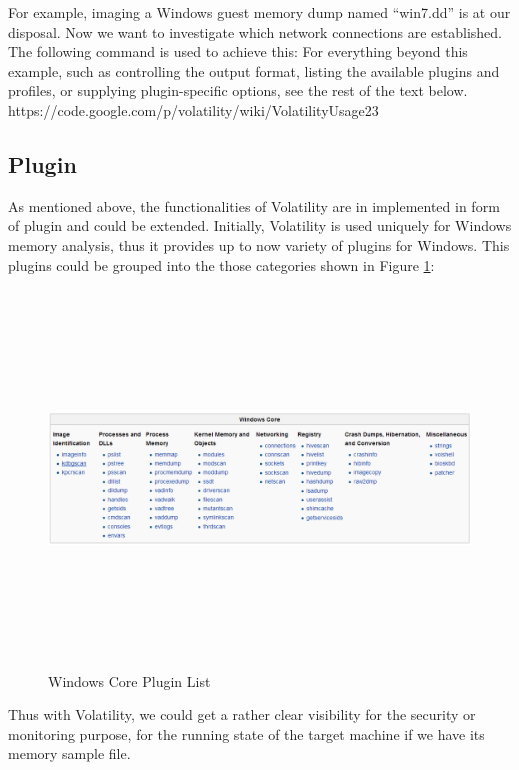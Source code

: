 For example, imaging a Windows guest memory dump named “win7.dd” is at our disposal. Now we want to investigate which network connections are established.  
The following command is used to achieve this:
For everything beyond this example, such as controlling the output format, listing the available plugins and profiles, or supplying 
plugin-specific options, see the rest of the text below. https://code.google.com/p/volatility/wiki/VolatilityUsage23


\subsection{Plugin}
As mentioned above, the functionalities of Volatility are in implemented in form of plugin and could be extended. Initially, 
Volatility is used uniquely for Windows memory analysis, thus it provides up to now variety of plugins for Windows. This plugins could 
be grouped into the those categories shown in Figure \ref{fig:Windows Core Plugin List}:

\begin{figure}[htbp]
	\centering
		\includegraphics[width=14cm, height= 10cm ]{Figures/Figure23.png}
	\caption[Windows Core Plugin List]{Windows Core Plugin List}
	\label{fig:Windows Core Plugin List}
\end{figure}

Thus with Volatility, we could get a rather clear visibility for the security or monitoring purpose, for the running state of the target
machine if we have its memory sample file.

